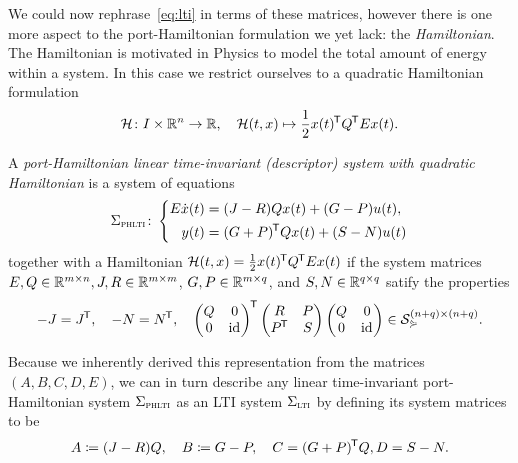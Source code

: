 We could now rephrase~\eqref{eq:lti} in terms of these matrices, however there is one more aspect to the port-Hamiltonian formulation we yet lack: the \emph{Hamiltonian}.
The Hamiltonian is motivated in Physics to model the total amount of energy within a system.
In this case we restrict ourselves to a quadratic Hamiltonian formulation
\begin{equation}\label{eq:quadratic-hamiltonian}
    \mathcal{H} \colon I \times \mathbb{R}^{n} \to \mathbb{R},\quad \mathcal{H}(t, x) \mapsto \frac{1}{2} x(t)^{\mkern-1.5mu \mathsf{T}} Q^{\mkern-1.5mu \mathsf{T}} E x(t).
\end{equation}

\begin{definition}\label{def:phlti}
    A \emph{port-Hamiltonian linear time-invariant (descriptor) system with quadratic Hamiltonian} is a system of equations
    \begin{equation}\label{eq:phlti}
        \Sigma_{\textsc{phlti}} \colon \left\lbrace
        \begin{aligned}
            E \dot{x}(t) &= (J - R) Q x(t) + (G - P) u(t), \\
            y(t) &= (G + P)^{\mkern-1.5mu \mathsf{T}} Q x(t) + (S - N) u(t)
        \end{aligned}
        \right.
    \end{equation}
    together with a Hamiltonian $\mathcal{H}(t, x) = \frac{1}{2} x(t)^{\mkern-1.5mu \mathsf{T}} Q^{\mkern-1.5mu \mathsf{T}} E x(t)$ if the system matrices $E, Q \in \mathbb{R}^{m \times n}, J, R \in \mathbb{R}^{m \times m}$, $G, P \in \mathbb{R}^{m \times q}$, and $S, N \in \mathbb{R}^{q \times q}$ satify the properties
    \begin{equation}\label{eq:ph-matrix-structure}
        -J = J^{\mkern-1.5mu \mathsf{T}},\quad -N = N^{\mkern-1.5mu \mathsf{T}},\quad
        \begin{pmatrix}
            Q & 0 \\
            0 & \text{id}_{}
        \end{pmatrix}^{\mkern-1.5mu \mathsf{T}}
        \begin{pmatrix}
            R & P \\
            P^{\mkern-1.5mu \mathsf{T}} & S
        \end{pmatrix}
        \begin{pmatrix}
            Q & 0 \\
            0 & \text{id}_{}
        \end{pmatrix}
        \in \mathcal{S}_{\curlyeqsucc}^{(n + q) \times (n + q)}.
    \end{equation}
\end{definition}

\begin{remark}
    Because we inherently derived this representation from the matrices $(A, B, C, D, E)$, we can in turn describe any linear time-invariant port-Hamiltonian system $\Sigma_{\textsc{phlti}}$ as an LTI system $\Sigma_{\textsc{lti}}$ by defining its system matrices to be
    \begin{equation*}
        A \coloneqq (J - R) Q,\quad B \coloneqq G - P,\quad C = (G + P)^{\mkern-1.5mu \mathsf{T}} Q, D = S - N.
    \end{equation*}
\end{remark}

